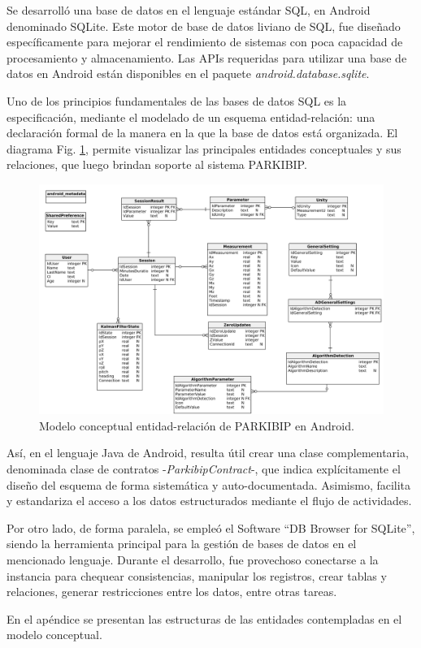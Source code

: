 Se desarrolló una base de datos en el lenguaje estándar SQL, en Android denominado SQLite. Este motor de base de datos liviano de SQL, fue diseñado específicamente para mejorar el rendimiento de sistemas con poca capacidad de procesamiento y almacenamiento. Las APIs requeridas para utilizar una base de datos en Android están disponibles en el paquete \textit{android.database.sqlite}. 

Uno de los principios fundamentales de las bases de datos SQL es la especificación, mediante el modelado de un esquema entidad-relación: una declaración formal de la manera en la que la base de datos está organizada. El diagrama Fig. \ref{FIG: database-mer}, permite visualizar las principales entidades conceptuales y sus relaciones, que luego brindan soporte al sistema PARKIBIP. 

\newpage

\begin{figure}[H]
    \centering
    \includegraphics[clip,width=1.1 \columnwidth]{TESIS/imagenes/chap05/database-mer.png}
    \caption{Modelo conceptual entidad-relación de PARKIBIP en Android.}
    \label{FIG: database-mer}
\end{figure}

Así, en el lenguaje Java de Android, resulta útil crear una clase complementaria, denominada clase de contratos -\textit{ParkibipContract}-, que indica explícitamente el diseño del esquema de forma sistemática y auto-documentada. Asimismo, facilita y estandariza el acceso a los datos estructurados mediante el flujo de actividades.

Por otro lado, de forma paralela, se empleó el Software ``DB Browser for SQLite'', siendo la herramienta principal para la gestión de bases de datos en el mencionado lenguaje. Durante el desarrollo, fue provechoso conectarse a la instancia para chequear consistencias, manipular los registros, crear tablas y relaciones, generar restricciones entre los datos, entre otras tareas.

En el apéndice  se presentan las estructuras de las entidades contempladas en el modelo conceptual. 
